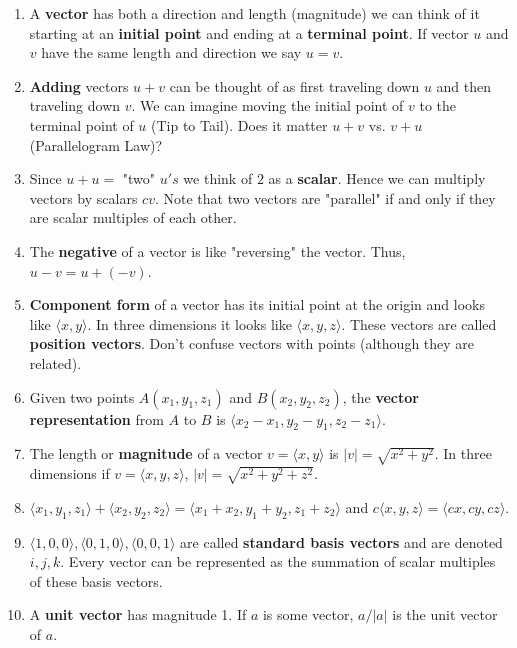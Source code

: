 \documentclass[11pt]{article}
\begin{document}
\begin{enumerate}
    \item A \textbf{vector} has both a direction and length (magnitude) we can think of it starting at an \textbf{initial point} and ending at a \textbf{terminal point}. If vector $u$ and $v$ have the same length and direction we say $u=v$.
    \item  \textbf{Adding} vectors $u+v$ can be thought of as first traveling down $u$ and then traveling down $v$. We can imagine moving the initial point of $v$ to the terminal point of $u$ (Tip to Tail). Does it matter $u+v$ vs. $v+u$ (Parallelogram Law)?
    \item Since $u+u=$ "two" $u's$ we think of $2$ as a \textbf{scalar}. Hence we can multiply vectors by scalars $cv$. Note that two vectors are "parallel" if and only if they are scalar multiples of each other. 
    \item The \textbf{negative} of a vector is like "reversing" the vector. Thus, $u-v = u + (-v)$.
    \item \textbf{Component form} of a vector has its initial point at the origin and looks like $\langle x,y \rangle$. In three dimensions it looks like $\langle x,y,z \rangle$. These vectors are called \textbf{position vectors}. Don't confuse vectors with points (although they are related).

    \item Given two points $A(x_1,y_1,z_1)$ and $B(x_2,y_2,z_2)$, the \textbf{vector representation} from $A$ to $B$ is $\langle x_2-x_1,y_2-y_1,z_2-z_1 \rangle$.

    \item The length or \textbf{magnitude} of a vector $v= \langle x,y \rangle$ is $|v|=\sqrt{x^2+y^2}$. In three dimensions if $v= \langle x,y,z \rangle$, $|v|=\sqrt{x^2+y^2+z^2}$.

    \item $\langle x_1,y_1,z_1 \rangle + \langle x_2,y_2,z_2 \rangle = \langle x_1+x_2, y_1+y_2, z_1+z_2 \rangle$ and $c\langle x,y,z \rangle = \langle cx,cy,cz \rangle$.


    \item $\langle 1,0,0 \rangle , \langle 0,1,0 \rangle , \langle 0,0,1 \rangle$ are called \textbf{standard basis vectors} and are denoted $i,j,k$. Every vector can be represented as the summation of scalar multiples of these basis vectors.

    \item  A \textbf{unit vector} has magnitude 1. If $a$ is some vector, $a/|a|$ is the unit vector of $a$.
\end{enumerate}
\end{document}
